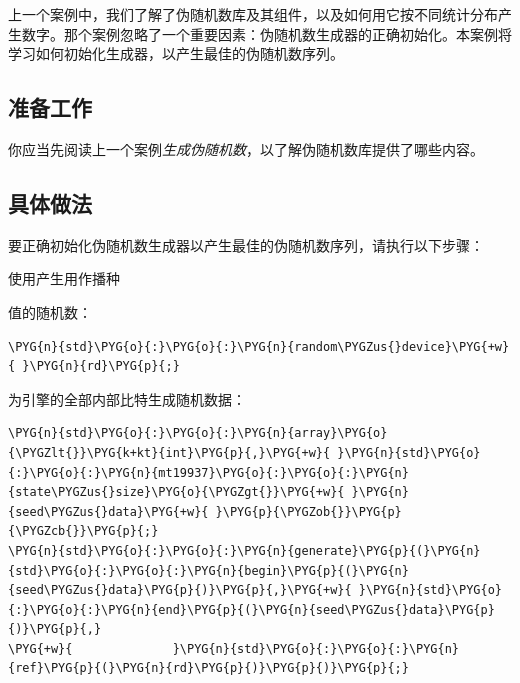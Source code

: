 
上一个案例中，我们了解了伪随机数库及其组件，以及如何用它按不同统计分布产生数字。那个案例忽略了一个重要因素：伪随机数生成器的正确初始化。本案例将学习如何初始化生成器，以产生最佳的伪随机数序列。



\subsection{准备工作}



你应当先阅读上一个案例\textit{生成伪随机数}，以了解伪随机数库提供了哪些内容。



\subsection{具体做法}



要正确初始化伪随机数生成器以产生最佳的伪随机数序列，请执行以下步骤：



使用产生用作播种



值的随机数：



\begin{codeblockbg}
\begin{Verbatim}[commandchars=\\\{\},breaklines=true,breakanywhere=true,fontsize=\codefont,xleftmargin=17bp]
\PYG{n}{std}\PYG{o}{:}\PYG{o}{:}\PYG{n}{random\PYGZus{}device}\PYG{+w}{ }\PYG{n}{rd}\PYG{p}{;}
\end{Verbatim}
\end{codeblockbg}



为引擎的全部内部比特生成随机数据：



\begin{codeblockbg}
\begin{Verbatim}[commandchars=\\\{\},breaklines=true,breakanywhere=true,fontsize=\codefont,xleftmargin=17bp]
\PYG{n}{std}\PYG{o}{:}\PYG{o}{:}\PYG{n}{array}\PYG{o}{\PYGZlt{}}\PYG{k+kt}{int}\PYG{p}{,}\PYG{+w}{ }\PYG{n}{std}\PYG{o}{:}\PYG{o}{:}\PYG{n}{mt19937}\PYG{o}{:}\PYG{o}{:}\PYG{n}{state\PYGZus{}size}\PYG{o}{\PYGZgt{}}\PYG{+w}{ }\PYG{n}{seed\PYGZus{}data}\PYG{+w}{ }\PYG{p}{\PYGZob{}}\PYG{p}{\PYGZcb{}}\PYG{p}{;}
\PYG{n}{std}\PYG{o}{:}\PYG{o}{:}\PYG{n}{generate}\PYG{p}{(}\PYG{n}{std}\PYG{o}{:}\PYG{o}{:}\PYG{n}{begin}\PYG{p}{(}\PYG{n}{seed\PYGZus{}data}\PYG{p}{)}\PYG{p}{,}\PYG{+w}{ }\PYG{n}{std}\PYG{o}{:}\PYG{o}{:}\PYG{n}{end}\PYG{p}{(}\PYG{n}{seed\PYGZus{}data}\PYG{p}{)}\PYG{p}{,}
\PYG{+w}{              }\PYG{n}{std}\PYG{o}{:}\PYG{o}{:}\PYG{n}{ref}\PYG{p}{(}\PYG{n}{rd}\PYG{p}{)}\PYG{p}{)}\PYG{p}{;}
\end{Verbatim}
\end{codeblockbg}


